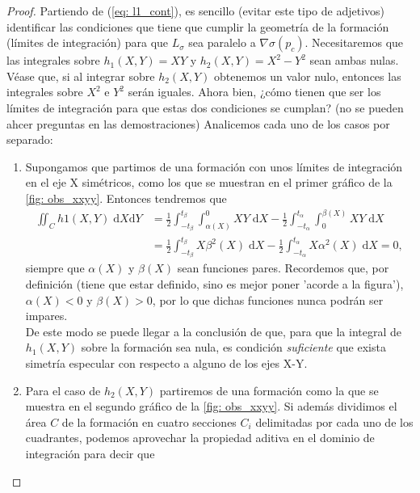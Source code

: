\begin{proof}

Partiendo de (\ref{eq: l1_cont}), es {\color{red}sencillo (evitar este tipo de adjetivos)} identificar las condiciones que tiene que cumplir la geometría de la formación (límites de integración) para que $L_\sigma$ sea paralelo a $\nabla\sigma(p_c)$. Necesitaremos que las integrales sobre $h_1(X,Y) = XY$ y $h_2(X,Y) = X^2 - Y^2$ sean ambas nulas. Véase que, si al integrar sobre $h_2(X,Y)$ obtenemos un valor nulo, entonces las integrales sobre $X^2$ e $Y^2$ serán iguales. Ahora bien, {\color{red} ¿cómo tienen que ser los límites de integración para que estas dos condiciones se cumplan? (no se pueden ahcer preguntas en las demostraciones)} Analicemos cada uno de los casos por separado:



\begin{enumerate}
        \item Supongamos que partimos de una formación con unos límites de integración en el eje X simétricos, como los que se muestran en el primer gráfico de la \autoref{fig: obs_xxyy}. Entonces tendremos que
    \begin{align*}
        \iint_{C} h1(X,Y) \; \mathrm{d}X \mathrm{d}Y 
        & = \frac{1}{2} \int_{-t_\beta}^{t_\beta}\int_{\alpha(X)}^{0} XY \; \mathrm{d}X
        - \frac{1}{2} \int_{-t_\alpha}^{t_\alpha}\int_{0}^{\beta(X)}  XY \; \mathrm{d}X 
        \\
        & = \frac{1}{2} \int_{-t_\beta}^{t_\beta}   X\beta^2(X)  \; \mathrm{d}X
        - \frac{1}{2} \int_{-t_\alpha}^{t_\alpha} X\alpha^2(X) \; \mathrm{d}X
        = 0,
    \end{align*}
    siempre que $\alpha(X)$ y $\beta(X)$ sean funciones pares. Recordemos que, {\color{red}por definición (tiene que estar definido, sino es mejor poner 'acorde a la figura')}, $\alpha(X)<0$ y $\beta(X)>0$, por lo que dichas funciones nunca podrán ser impares.\\
    
    De este modo se puede llegar a la conclusión de que, para que la integral de $h_1(X,Y)$ sobre la formación sea nula, es condición \textit{suficiente} que exista simetría especular con respecto a alguno de los ejes X-Y.\\
    
    \item Para el caso de $h_2(X,Y)$ partiremos de una formación como la que se muestra en el segundo gráfico de la \autoref{fig: obs_xxyy}. Si además dividimos el área $C$ de la formación en cuatro secciones $C_i$ delimitadas por cada uno de los cuadrantes, podemos aprovechar la propiedad aditiva en el dominio de integración para decir que
    

\end{enumerate}
\end{proof}
